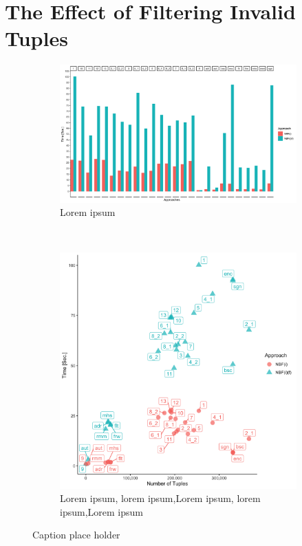 \section{The Effect of Filtering Invalid Tuples}
\label{sec:exp-tuples}


\begin{figure}[t!]
    \centering
    \begin{subfigure}[t]{0.5\textwidth}
        \centering
        \includegraphics[width=\textwidth]{figs/plots/enron-nbfi-comp-f.png}
        \caption{Lorem ipsum}
    \end{subfigure}%
    ~ 
    \begin{subfigure}[t]{0.5\textwidth}
        \centering
        \includegraphics[scale=0.09]{figs/plots/enron-nbfi-f-comp-scatter.png}
        \caption{Lorem ipsum, lorem ipsum,Lorem ipsum, lorem ipsum,Lorem ipsum}
    \end{subfigure}
    \caption{Caption place holder}
\end{figure}

